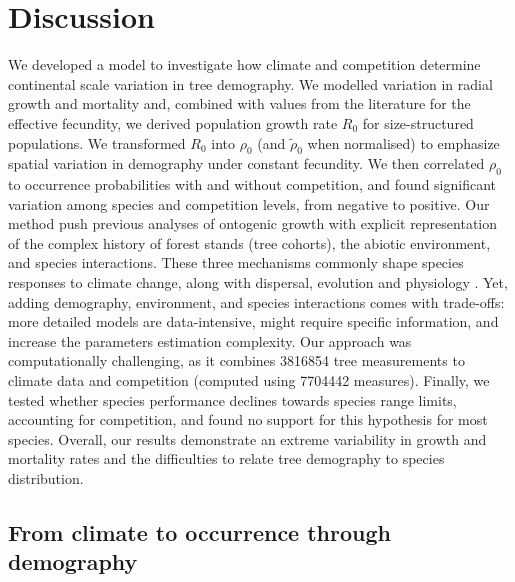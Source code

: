 

\section{Discussion}
We developed a model to investigate how climate and competition determine continental scale variation in tree demography. We modelled variation in radial growth and mortality and, combined with values from the literature for the effective fecundity, we derived population growth rate $ R_0 $ for size-structured populations. We transformed $ R_0 $ into $ \rho_0 $ (and $ \tilde \rho_0 $ when normalised) to emphasize spatial variation in demography under constant fecundity. We then correlated $ \rho_0 $ to occurrence probabilities with and without competition, and found significant variation among species and competition levels, from negative to positive. Our method push previous analyses of ontogenic growth \citep{McGill2012, Thuiller2014} with explicit representation of the complex history of forest stands (\ie tree cohorts), the abiotic environment, and species interactions. These three mechanisms commonly shape species responses to climate change, along with dispersal, evolution and physiology \citep{Urban2016}. Yet, adding demography, environment, and species interactions comes with trade-offs: more detailed models are data-intensive, might require specific information, and increase the parameters estimation complexity. Our approach was computationally challenging, as it combines \num{3816854} tree measurements to climate data and competition (computed using \num{7704442} measures). Finally, we tested whether species performance declines towards species range limits, accounting for competition, and found no support for this hypothesis for most species. Overall, our results demonstrate an extreme variability in growth and mortality rates and the difficulties to relate tree demography to species distribution.

\subsection{From climate to occurrence through demography}
